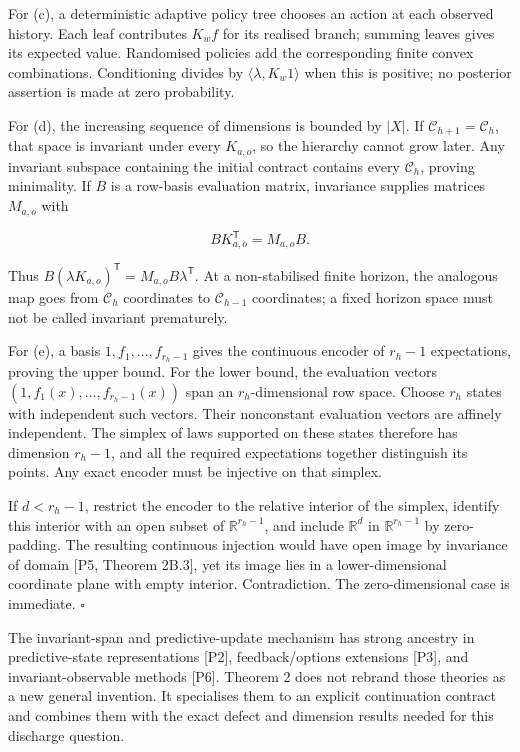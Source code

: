\documentclass[11pt,a4paper]{article}
\begin{document}
For (c), a deterministic adaptive policy tree chooses an action at each
observed history. Each leaf contributes \(K_wf\) for its realised
branch; summing leaves gives its expected value. Randomised policies add
the corresponding finite convex combinations. Conditioning divides by
\(\langle\lambda,K_w1\rangle\) when this is positive; no posterior
assertion is made at zero probability.

For (d), the increasing sequence of dimensions is bounded by \(|X|\). If
\(\mathscr C_{h+1}=\mathscr C_h\), that space is invariant under every
\(K_{a,o}\), so the hierarchy cannot grow later. Any invariant subspace
containing the initial contract contains every \(\mathscr C_h\), proving
minimality. If \(B\) is a row-basis evaluation matrix, invariance
supplies matrices \(M_{a,o}\) with

\nopagebreak[4]

\[
B K_{a,o}^{\mathsf T}=M_{a,o}B.
\]

Thus \(B(\lambda K_{a,o})^{\mathsf T}=M_{a,o}B\lambda^{\mathsf T}\). At
a non-stabilised finite horizon, the analogous map goes from
\(\mathscr C_h\) coordinates to \(\mathscr C_{h-1}\) coordinates; a
fixed horizon space must not be called invariant prematurely.

For (e), a basis \(1,f_1,\ldots,f_{r_h-1}\) gives the continuous encoder
of \(r_h-1\) expectations, proving the upper bound. For the lower bound,
the evaluation vectors \((1,f_1(x),\ldots,f_{r_h-1}(x))\) span an
\(r_h\)-dimensional row space. Choose \(r_h\) states with independent
such vectors. Their nonconstant evaluation vectors are affinely
independent. The simplex of laws supported on these states therefore has
dimension \(r_h-1\), and all the required expectations together
distinguish its points. Any exact encoder must be injective on that
simplex.

If \(d<r_h-1\), restrict the encoder to the relative interior of the
simplex, identify this interior with an open subset of
\(\mathbb R^{r_h-1}\), and include \(\mathbb R^d\) in
\(\mathbb R^{r_h-1}\) by zero-padding. The resulting continuous
injection would have open image by invariance of domain {[}P5, Theorem
2B.3{]}, yet its image lies in a lower-dimensional coordinate plane with
empty interior. Contradiction. The zero-dimensional case is immediate.
\(\square\)

The invariant-span and predictive-update mechanism has strong ancestry
in predictive-state representations {[}P2{]}, feedback/options
extensions {[}P3{]}, and invariant-observable methods {[}P6{]}. Theorem
2 does not rebrand those theories as a new general invention. It
specialises them to an explicit continuation contract and combines them
with the exact defect and dimension results needed for this discharge
question.
\end{document}
